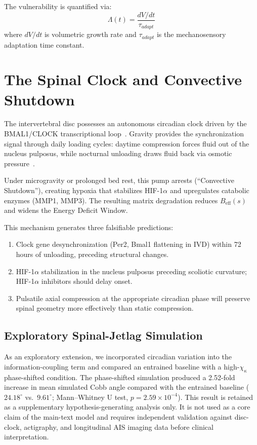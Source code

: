 The vulnerability is quantified via:
\begin{equation}
\Lambda(t) = \frac{dV/dt}{\tau_{adapt}}
\end{equation}
where $dV/dt$ is volumetric growth rate and $\tau_{adapt}$ is the mechanosensory adaptation time constant.

\section{The Spinal Clock and Convective Shutdown}

The intervertebral disc possesses an autonomous circadian clock driven by the BMAL1/CLOCK transcriptional loop~\cite{dudek2017clock}. Gravity provides the synchronization signal through daily loading cycles: daytime compression forces fluid out of the nucleus pulposus, while nocturnal unloading draws fluid back via osmotic pressure~\cite{urban2004nutrition}.

Under microgravity or prolonged bed rest, this pump arrests (``Convective Shutdown''), creating hypoxia that stabilizes HIF-1$\alpha$ and upregulates catabolic enzymes (MMP1, MMP3). The resulting matrix degradation reduces $B_{\mathrm{eff}}(s)$ and widens the Energy Deficit Window.

This mechanism generates three falsifiable predictions:
\begin{enumerate}
    \item Clock gene desynchronization (Per2, Bmal1 flattening in IVD) within 72 hours of unloading, preceding structural changes.
    \item HIF-1$\alpha$ stabilization in the nucleus pulposus preceding scoliotic curvature; HIF-1$\alpha$ inhibitors should delay onset.
    \item Pulsatile axial compression at the appropriate circadian phase will preserve spinal geometry more effectively than static compression.
\end{enumerate}

\subsection{Exploratory Spinal-Jetlag Simulation}

As an exploratory extension, we incorporated circadian variation into the information-coupling term and compared an entrained baseline with a high-$\chi_\kappa$ phase-shifted condition. The phase-shifted simulation produced a 2.52-fold increase in mean simulated Cobb angle compared with the entrained baseline ($24.18^\circ$ vs.\ $9.61^\circ$; Mann--Whitney U test, $p = 2.59\times 10^{-4}$). This result is retained as a supplementary hypothesis-generating analysis only. It is not used as a core claim of the main-text model and requires independent validation against disc-clock, actigraphy, and longitudinal AIS imaging data before clinical interpretation.

